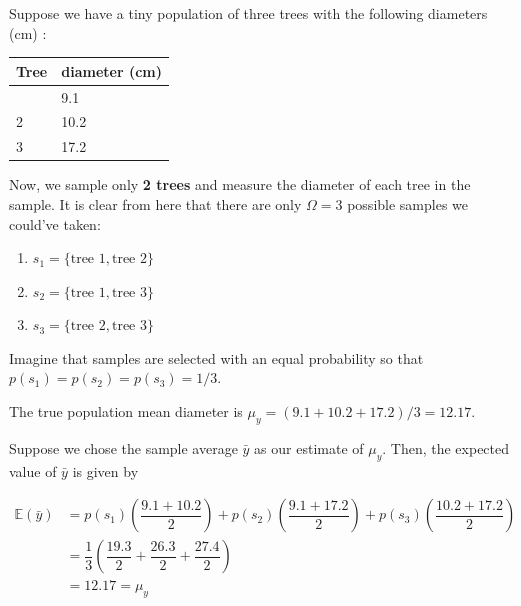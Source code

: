 \documentclass[
  letterpaper,
  DIV=11,
  numbers=noendperiod]{scrartcl}
\providecommand{\tightlist}{%
  \setlength{\itemsep}{0pt}\setlength{\parskip}{0pt}}\usepackage{longtable,booktabs,array}
\begin{document}
\begin{tcolorbox}[enhanced jigsaw, title={Task 1}, colback=white, coltitle=black, leftrule=.75mm, rightrule=.15mm, breakable, colbacktitle=quarto-callout-important-color!10!white, toptitle=1mm, colframe=quarto-callout-important-color-frame, opacityback=0, titlerule=0mm, arc=.35mm, opacitybacktitle=0.6, toprule=.15mm, left=2mm, bottomrule=.15mm, bottomtitle=1mm]

Suppose we have a tiny population of three trees with the following
diameters (cm) :

\begin{longtable}[]{@{}ll@{}}
\toprule\noalign{}
Tree & diameter (cm) \\
\midrule\noalign{}
\endhead
\bottomrule\noalign{}
\endlastfoot
1 & 9.1 \\
2 & 10.2 \\
3 & 17.2 \\
\end{longtable}

Now, we sample only \textbf{2 trees} and measure the diameter of each
tree in the sample. It is clear from here that there are only
\(\Omega=3\) possible samples we could've taken:

\begin{enumerate}
\def\labelenumi{\arabic{enumi}.}
\tightlist
\item
  \(s_1 = \{\text{tree 1},\text{tree 2}\}\)
\item
  \(s_2 = \{\text{tree 1},\text{tree 3}\}\)
\item
  \(s_3 = \{\text{tree 2},\text{tree 3}\}\)
\end{enumerate}

Imagine that samples are selected with an equal probability so that
\(p(s_1) = p(s_2) = p(s_3) = 1/3\).

The true population mean diameter is
\(\mu_y = ( 9.1+10.2+ 17.2)/3 =12.17\).

Suppose we chose the sample average \(\bar{y}\) as our estimate of
\(\mu_y\). Then, the expected value of \(\bar{y}\) is given by

\[
\begin{aligned}\mathbb{E}(\bar{y}) &= p(s_1) \left(\dfrac{9.1+10.2}{2}\right) +  p(s_2) \left(\dfrac{9.1+17.2}{2}\right) +  p(s_3) \left(\dfrac{10.2+17.2}{2}\right)\\&= \dfrac{1}{3}\left(\dfrac{19.3}{2} + \dfrac{26.3}{2} + \dfrac{27.4}{2} \right)\\&= 12.17 = \mu_y\end{aligned}
\]


\end{tcolorbox}
\end{document}
